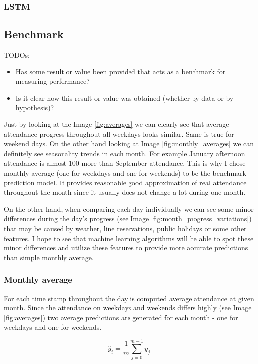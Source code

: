 \documentclass{article}
\begin{document}
\subsubsection{LSTM}

\subsection{Benchmark}
\color{red}
TODOs:
\begin{itemize}
    \item Has some result or value been provided that acts as a benchmark for measuring performance?
    \item Is it clear how this result or value was obtained (whether by data or by hypothesis)?
\end{itemize}
\color{black}

Just by looking at the Image \ref{fig:averages} we can clearly see that average attendance progress throughout all weekdays looks similar. Same is true for weekend days. On the other hand looking at Image \ref{fig:monthly_averages} we can definitely see seasonality trends in each month. For example January afternoon attendance is almost 100 more than September attendance. This is why I chose monthly average (one for weekdays and one for weekends) to be the benchmark prediction model. It provides reasonable good approximation of real attendance throughout the month since it usually does not change a lot during one month. 

On the other hand, when comparing each day individually we can see some minor differences during the day's progress (see Image \ref{fig:month_progress_variations}) that may be caused by weather, line reservations, public holidays or some other features. I hope to see that machine learning algorithms will be able to spot these minor differences and utilize these features to provide more accurate predictions than simple monthly average.

\subsubsection{Monthly average}
For each time stamp throughout the day is computed average attendance at given month. Since the attendance on weekdays and weekends differs highly (see Image \ref{fig:averages}) two average predictions are generated for each month - one for weekdays and one for weekends. 

\begin{equation}
\label{eq:monthly_avg}
\hat{y}_i = \dfrac{1}{m} \sum^{m-1}_{j=0}y_j
\end{equation}
\end{document}
